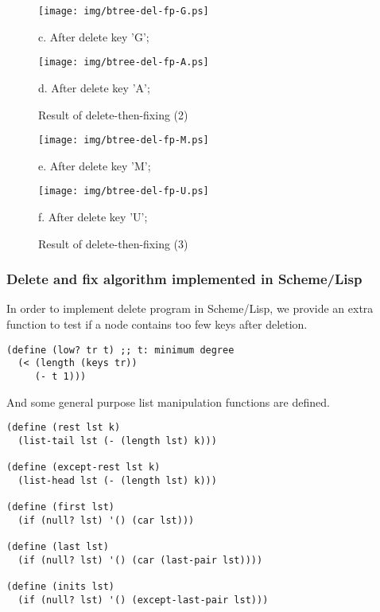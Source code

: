 \documentclass{article}
\begin{document}
\begin{figure}[htbp]
    \begin{center}
      \texttt{[image: img/btree-del-fp-G.ps]}

      c. After delete key 'G';

      \texttt{[image: img/btree-del-fp-A.ps]}

      d. After delete key 'A';
      \caption{Result of delete-then-fixing (2)} \label{fig:result-del-fp2}
    \end{center}
\end{figure}

\begin{figure}[htbp]
    \begin{center}
      \texttt{[image: img/btree-del-fp-M.ps]}

      e. After delete key 'M';

      \texttt{[image: img/btree-del-fp-U.ps]}

      f. After delete key 'U';
      \caption{Result of delete-then-fixing (3)} \label{fig:result-del-fp3}
    \end{center}
\end{figure}


\subsubsection{Delete and fix algorithm implemented in Scheme/Lisp}
In order to implement delete program in Scheme/Lisp, we provide an
extra function to test if a node contains too few keys after deletion.

\lstset{language=lisp}
\begin{lstlisting}
(define (low? tr t) ;; t: minimum degree
  (< (length (keys tr)) 
     (- t 1)))
\end{lstlisting}

And some general purpose list manipulation functions are defined.

\begin{lstlisting}
(define (rest lst k)
  (list-tail lst (- (length lst) k)))

(define (except-rest lst k)
  (list-head lst (- (length lst) k)))

(define (first lst)
  (if (null? lst) '() (car lst)))

(define (last lst)
  (if (null? lst) '() (car (last-pair lst))))

(define (inits lst)
  (if (null? lst) '() (except-last-pair lst)))
\end{lstlisting}
\end{document}
